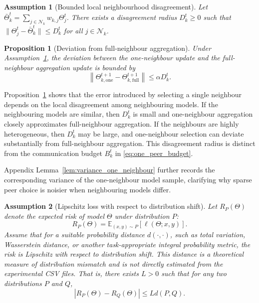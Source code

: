 \documentclass[conference]{IEEEtran}
\newtheorem{assumption}{Assumption}
\newtheorem{proposition}{Proposition}
\begin{document}
\begin{assumption}[Bounded local neighbourhood disagreement]
\label{ass:bounded_disagreement}
Let $\bar{\Theta}_k^t=\sum_{j\in\mathcal{N}_k}w_{k,j}\Theta_j^t$. There exists a disagreement radius $D_k^t\geq0$ such that $\|\Theta_j^t-\bar{\Theta}_k^t\|\leq D_k^t$ for all $j\in\mathcal{N}_k$.
\end{assumption}

\begin{proposition}[Deviation from full-neighbour aggregation]
\label{prop:deviation_full}
Under Assumption~\ref{ass:bounded_disagreement}, the deviation between the one-neighbour update and the full-neighbour aggregation update is bounded by
\begin{equation*}
\left\|
\Theta_{k,\mathrm{one}}^{t+1}
-
\Theta_{k,\mathrm{full}}^{t+1}
\right\|
\leq
\alpha D_k^t.
\end{equation*}
\end{proposition}

Proposition~\ref{prop:deviation_full} shows that the error introduced by selecting a single neighbour depends on the local disagreement among neighbouring models. If the neighbouring models are similar, then $D_k^t$ is small and one-neighbour aggregation closely approximates full-neighbour aggregation. If the neighbours are highly heterogeneous, then $D_k^t$ may be large, and one-neighbour selection can deviate substantially from full-neighbour aggregation. This disagreement radius is distinct from the communication budget \(B_k^t\) in \eqref{eq:one_peer_budget}.

Appendix Lemma~\ref{lem:variance_one_neighbour} further records the corresponding variance of the one-neighbour model sample, clarifying why sparse peer choice is noisier when neighbouring models differ.

\begin{assumption}[Lipschitz loss with respect to distribution shift]
\label{ass:lipschitz_distribution}
Let $R_P(\Theta)$ denote the expected risk of model $\Theta$ under distribution $P$:
\begin{equation*}
R_P(\Theta)
=
\mathbb{E}_{(x,y)\sim P}
[
\ell(\Theta;x,y)
].
\end{equation*}
Assume that for a suitable probability distance $d(\cdot,\cdot)$, such as total variation, Wasserstein distance, or another task-appropriate integral probability metric, the risk is Lipschitz with respect to distribution shift. This distance is a theoretical measure of distribution mismatch and is not directly estimated from the experimental CSV files. That is, there exists $L>0$ such that for any two distributions $P$ and $Q$,
\begin{equation*}
|R_P(\Theta)-R_Q(\Theta)|
\leq
L d(P,Q).
\end{equation*}
\end{assumption}
\end{document}
